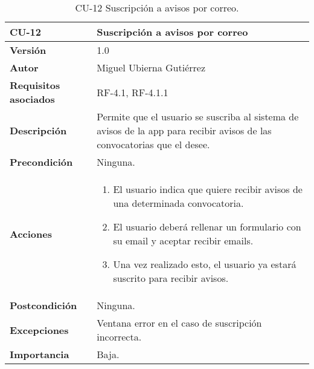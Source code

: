 \begin{table}[p]
	\centering
	\begin{tabularx}{\linewidth}{ p{} p{} }
		\toprule
		\textbf{CU-12}    & \textbf{Suscripción a avisos por correo}\\
		\toprule
		\textbf{Versión}              & 1.0    \\
		\textbf{Autor}                & Miguel Ubierna Gutiérrez \\
		\textbf{Requisitos asociados} & RF-4.1, RF-4.1.1  \\
		\textbf{Descripción}          & Permite que el usuario se suscriba al sistema de avisos de la app para recibir avisos de las convocatorias que el desee.  \\
		\textbf{Precondición}         & Ninguna.\\
		\textbf{Acciones}             &
		\begin{enumerate}
			\def\labelenumi{\arabic{enumi}.}
			\tightlist
			\item El usuario indica que quiere recibir avisos de una determinada convocatoria.
                \item El usuario deberá rellenar un formulario con su email y aceptar recibir emails.
                \item Una vez realizado esto, el usuario ya estará suscrito para recibir avisos.
		\end{enumerate}\\
		\textbf{Postcondición}        & Ninguna. \\
		\textbf{Excepciones}          & Ventana error en el caso de suscripción incorrecta.  \\
		\textbf{Importancia}          & Baja.  \\
		\bottomrule
	\end{tabularx}
	\caption{CU-12 Suscripción a avisos por correo.}
\end{table}



